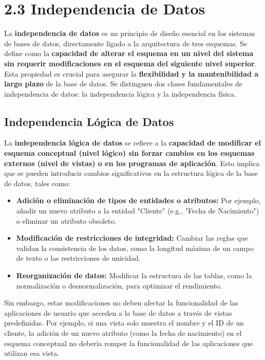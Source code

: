 \section{2.3 Independencia de Datos}

La \textbf{independencia de datos} es un principio de diseño esencial en los sistemas de bases de datos, directamente ligado a la arquitectura de tres esquemas.  Se define como la \textbf{capacidad de alterar el esquema en un nivel del sistema sin requerir modificaciones en el esquema del siguiente nivel superior}.  Esta propiedad es crucial para asegurar la \textbf{flexibilidad y la mantenibilidad a largo plazo} de la base de datos. Se distinguen dos clases fundamentales de independencia de datos: la independencia lógica y la independencia física.

\subsection{Independencia Lógica de Datos}

La \textbf{independencia lógica de datos} se refiere a la \textbf{capacidad de modificar el esquema conceptual (nivel lógico) sin forzar cambios en los esquemas externos (nivel de vistas) o en los programas de aplicación}.  Esto implica que se pueden introducir cambios significativos en la estructura lógica de la base de datos, tales como:

\begin{itemize}
    \item \textbf{Adición o eliminación de tipos de entidades o atributos:} Por ejemplo, añadir un nuevo atributo a la entidad "Cliente" (e.g., "Fecha de Nacimiento") o eliminar un atributo obsoleto.
    \item \textbf{Modificación de restricciones de integridad:}  Cambiar las reglas que validan la consistencia de los datos, como la longitud máxima de un campo de texto o las restricciones de unicidad.
    \item \textbf{Reorganización de datos:} Modificar la estructura de las tablas,  como la normalización o desnormalización, para optimizar el rendimiento.
\end{itemize}

Sin embargo, estas modificaciones no deben afectar la funcionalidad de las aplicaciones de usuario que acceden a la base de datos a través de vistas predefinidas.  Por ejemplo, si una vista solo muestra el nombre y el ID de un cliente, la adición de un nuevo atributo (como la fecha de nacimiento) en el esquema conceptual no debería romper la funcionalidad de las aplicaciones que utilizan esa vista.

